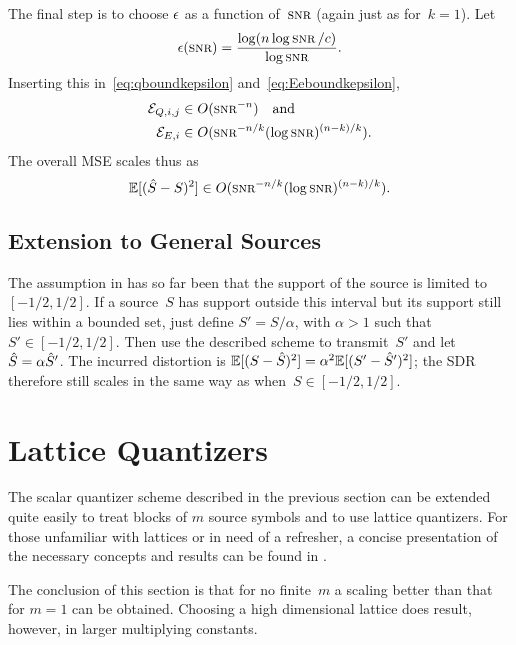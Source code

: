 The final step is to choose $\epsilon$ as a function of~$\snr$ (again just as
for~$k=1$). Let
\begin{equation*}
  \e(\snr) = \frac{\log(n \log\snr / c)}{\log\snr}.
\end{equation*}
Inserting this in~\eqref{eq:qboundkepsilon} and~\eqref{eq:Eeboundkepsilon}, 
\begin{align*}
  \Err_{Q,i,j} &\in O(\snr^{-n}) \quad\text{and} \\
  \Err_{E,i} &\in O(\snr^{-n/k} (\log\snr)^{(n-k)/k}).
\end{align*}
The overall MSE scales thus as
\begin{equation*}
  \mse \in O(\snr^{-n/k} (\log\snr)^{(n-k)/k}).
\end{equation*}




\subsection{Extension to General Sources}

The assumption in  has so far been that the support of the
source is limited to~$[-1/2,1/2]$. If a source~$S$ has support outside this
interval but its support still lies within a bounded set, just define $S' =
S/\alpha$, with $\alpha > 1$ such that $S' \in [-1/2, 1/2]$. Then use
the described scheme to transmit~$S'$ and let ${\hat{S}} = \alpha {\hat{S}}'$. The
incurred distortion is $\mathbb{E}[(S - {\hat{S}})^2] = \alpha^2 \mathbb{E}[(S' - {\hat{S}}')^2]$; the SDR
therefore still scales in the same way as when~$S \in [-1/2, 1/2]$.



\section{Lattice Quantizers}\label{sec:latticequant}

The scalar quantizer scheme described in the previous section can be extended
quite easily to treat blocks of $m$ source symbols and to use lattice
quantizers. For those unfamiliar with lattices or in need of a refresher, a
concise presentation of the necessary concepts and results can be found in
.

The conclusion of this section is that for no finite~$m$ a scaling better than
that for $m=1$ can be obtained. Choosing a high dimensional lattice does result,
however, in larger multiplying constants.


